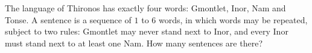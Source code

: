 The language of Thironos has exactly four words: Gmontlet, Inor, Nam and Tonse. A sentence is a sequence of $1$ to $6$ words, in which words may be repeated, subject to two rules: Gmontlet may never stand next to Inor, and every Inor must stand next to at least one Nam. How many sentences are there?
